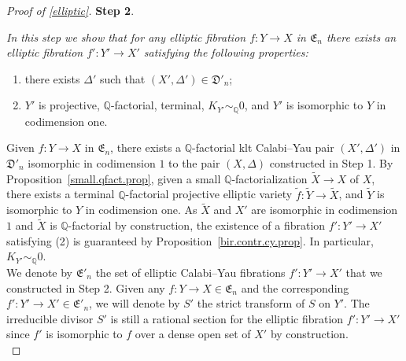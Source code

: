 \documentclass{amsart}[12pt,a4paper]
\theoremstyle{definition}
\begin{document}
\begin{proof}[Proof of \ref{elliptic}]
{\bf Step 2}. {\it In this step we show that for any elliptic fibration $f \colon Y \to X$ in $\mathfrak{E}_n$ there exists an elliptic fibration $f' \colon Y' \to X'$ satisfying the following properties:
\begin{enumerate}
\item there exists $\Delta'$ such that $(X', \Delta') \in \mathfrak{D}'_n$;
\item $Y'$ is projective, $\mathbb{Q}$-factorial, terminal, $K_{Y'} \sim_\mathbb{Q} 0$, and $Y'$ is isomorphic to $Y$ in codimension one.
\end{enumerate}
}
\noindent
Given $f \colon Y \to X$ in $\mathfrak{E}_n$, there exists a $\mathbb{Q}$-factorial klt Calabi--Yau pair $(X', \Delta')$ in $\mathfrak{D}'_n$ isomorphic in codimension $1$ to the pair $(X, \Delta)$ constructed in Step 1.
By Proposition~\ref{small.qfact.prop}, given a small $\mathbb{Q}$-factorialization $\widetilde{X} \to X$ of $X$, there exists a terminal $\mathbb{Q}$-factorial projective elliptic variety $\widetilde{f} \colon \widetilde{Y} \to \widetilde{X}$, and $\widetilde{Y}$ is isomorphic to $Y$ in codimension one.
As $\widetilde{X}$ and $X'$ are isomorphic in codimension $1$ and $\widetilde{X}$ is $\mathbb{Q}$-factorial by construction, the existence of a fibration $f' \colon Y' \to X'$ satisfying (2) is guaranteed by Proposition~\ref{bir.contr.cy.prop}.
In particular, $K_{Y'} \sim_{\mathbb{Q}} 0$.\\

\noindent
We denote by $\mathfrak{E}'_n$ the set of elliptic Calabi--Yau fibrations $f' \colon Y' \to X'$ that we constructed in Step 2.
Given any $f \colon Y \to X \in \mathfrak{E}_n$ and the corresponding $f' \colon Y' \to X' \in \mathfrak{E}'_n$, we will denote by $S'$ the strict transform of $S$ on $Y'$. 
The irreducible divisor $S'$ is still a rational section for the elliptic fibration $f' \colon Y' \to X'$ since $f'$ is isomorphic to $f$ over a dense open set of $X'$ by construction.\\


\end{proof}
\end{document}
